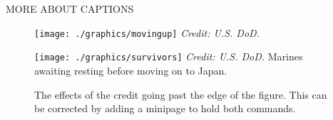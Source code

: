                  MORE ABOUT CAPTIONS
\newcommand\addcredit[1]{%
 \vspace*{-6.5pt}
 \scriptsize%
 \flushright%
 \textit{Credit: #1}%
}
\newpage
\pagestyle{empty}
\thispagestyle{empty}
\begin{figure}[htp]
\centering

\captionsetup{figurename=Photo., labelsep=period}%
   \begin{minipage}[t]{0.48\textwidth}
      \texttt{[image: ./graphics/movingup]}%
      \addcredit{U.S. DoD.}%
     \caption{The effects of the credit going past the edge of the figure. This can be corrected by adding a minipage to hold both commands. }
\end{minipage}\hfill\hfill
\begin{minipage}[t]{0.48\textwidth}
      \texttt{[image: ./graphics/survivors]}%
      \addcredit{U.S. DoD.}%
    {\footnotesize Marines awaiting resting before moving on to Japan. }
\end{minipage}

\end{figure}
\newpage


